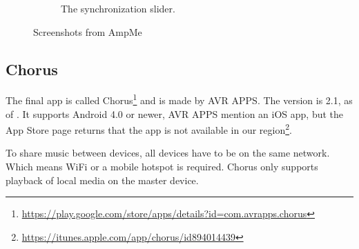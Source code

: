 \begin{figure}[h!]
\begin{subfigure}[b]{0.45\textwidth}
        \caption{The synchronization slider.}\label{fig:ampme_slider}
    \end{subfigure}
    \caption{Screenshots from AmpMe}\label{fig:ampme_screenshots}
\end{figure}

\subsection{Chorus}\label{subsec:chorus}
The final app is called Chorus\footnote{\url{https://play.google.com/store/apps/details?id=com.avrapps.chorus}} and is made by AVR APPS\@.
The version is 2.1, as of .
It supports Android 4.0 or newer, AVR APPS mention an iOS app, but the App Store page returns that the app is not available in our region\footnote{\url{https://itunes.apple.com/app/chorus/id894014439}}.

To share music between devices, all devices have to be on the same network.
Which means WiFi or a mobile hotspot is required.
Chorus only supports playback of local media on the master device.

